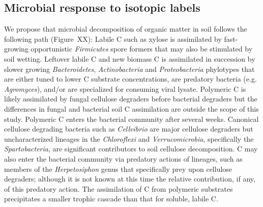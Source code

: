 \subsection{Microbial response to isotopic labels}
We propose that microbial decomposition of organic matter in soil follows the
following path (Figure~XX): Labile C such as xylose is assimilated by
fast-growing opportunistic \textit{Firmicutes} spore formers that may also be
stimulated by soil wetting. Leftover labile C and new biomass C is assimilated
in succession by slower growing \textit{Bacteroidetes}, \textit{Actinobacteria}
and \textit{Proteobacteria} phylotypes that are either tuned to lower C substrate
concentrations, are predatory bacteria (e.g. \textit{Agromyces}), and/or are
specialized for consuming viral lysate. Polymeric C is likely assimilated by
fungal cellulose degraders before bacterial degraders but the differences in
fungal and bacterial soil C assimilation are outside the scope of this study.
Polymeric C enters the bacterial community after several weeks. Canonical
cellulose degrading bacteria such as \textit{Cellvibrio} are major cellulose
degraders but uncharacterized lineages in the \textit{Chloroflexi} and
\textit{Verrucomicrobia}, specifically the \textit{Spartobacteria}, are
significant contributors to soil cellulose decomposition. C may also enter the bacterial community via predatory
actions of lineages, such as members of the \textit{Herpetosiphon} genus that specifically prey upon cellulose degraders; although it is not known at
this time the relative contribution, if any, of this predatory action. The
assimilation of C from polymeric substrates precipitates a smaller trophic
cascade than that for soluble, labile C.


